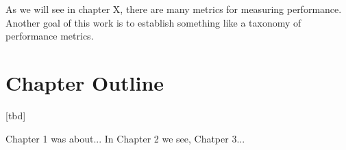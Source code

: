 As we will see in chapter X, there are many metrics for measuring performance.
Another goal of this work is to establish something like a taxonomy of performance metrics.











\section{Chapter Outline}

[tbd]


Chapter 1 was about...
In Chapter 2 we see,
Chatper 3...













